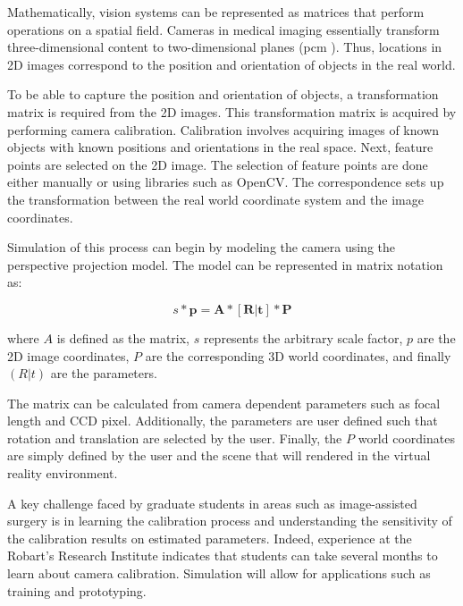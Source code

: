 \documentclass[11pt]{report}
\begin{document}


Mathematically, vision systems can be represented as matrices that perform operations on a spatial field. Cameras in medical imaging essentially transform three-dimensional content to two-dimensional planes (\gls{pcm} \cite{CV}). Thus, locations in 2D images correspond to the position and orientation of objects in the real world.

To be able to capture the position and orientation of objects, a transformation matrix is required from the 2D images. This transformation matrix is acquired by performing camera calibration. Calibration involves acquiring images of known objects with known positions and orientations in the real space. Next, feature points are selected on the 2D image. The selection of feature points are done either manually or using libraries such as OpenCV. The correspondence sets up the transformation between the real world coordinate system and the image coordinates.

Simulation of this process can begin by modeling the camera using the perspective projection model. The model can be represented in matrix notation as:

\begin{equation} s * \mathbf{p} = \mathbf{A} * [\mathbf{R}|\mathbf{t}] * \mathbf{P}  \end{equation}
 
where  \(A\) is defined as the  matrix, \(s\) represents the arbitrary scale factor, \(p\) are the 2D image coordinates, \(P\) are the corresponding 3D world coordinates, and finally \((R|t)\) are the  parameters.

The  matrix can be calculated from camera dependent parameters such as focal length and CCD pixel. Additionally, the  parameters are user defined such that rotation and translation are selected by the user. Finally, the \(P\) world coordinates are simply defined by the user and the scene that will rendered in the virtual reality environment. 

A key challenge faced by graduate students in areas such as image-assisted surgery is in learning the calibration process and understanding the sensitivity of the calibration results on estimated parameters. Indeed, experience at the Robart's Research Institute indicates that students can take several months to learn about camera calibration. Simulation will allow for applications such as training and prototyping. 
\end{document}
